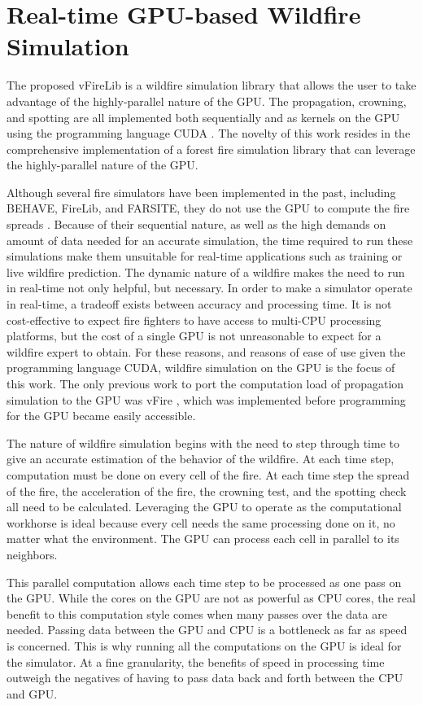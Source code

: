 \chapter{Real-time GPU-based Wildfire Simulation}
\label{chapter:gpuSim}
The proposed vFireLib is a wildfire simulation library that allows the user to take advantage of the highly-parallel nature of the GPU. The propagation, crowning, and spotting are all implemented both sequentially and as kernels on the GPU using the programming language CUDA \cite{cuda}. The novelty of this work resides in the comprehensive implementation of a forest fire simulation library that can leverage the highly-parallel nature of the GPU. 

Although several fire simulators have been implemented in the past, including BEHAVE, FireLib, and FARSITE, they do not use the GPU to compute the fire spreads \cite{fireLib,BEHAVE,FARSITE}. Because of their sequential nature, as well as the high demands on amount of data needed for an accurate simulation, the time required to run these simulations make them unsuitable for real-time applications such as training or live wildfire prediction. The dynamic nature of a wildfire makes the need to run in real-time not only helpful, but necessary. In order to make a simulator operate in real-time, a tradeoff exists between accuracy and processing time. It is not cost-effective to expect fire fighters to have access to multi-CPU processing platforms, but the cost of a single GPU is not unreasonable to expect for a wildfire expert to obtain. For these reasons, and reasons of ease of use given the programming language CUDA, wildfire simulation on the GPU is the focus of this work. The only previous work to port the computation load of propagation simulation to the GPU was vFire \cite{vFire}, which was implemented before programming for the GPU became easily accessible. 

The nature of wildfire simulation begins with the need to step through time to give an accurate estimation of the behavior of the wildfire. At each time step, computation must be done on every cell of the fire. At each time step the spread of the fire, the acceleration of the fire, the crowning test, and the spotting check all need to be calculated. Leveraging the GPU to operate as the computational workhorse is ideal because every cell needs the same processing done on it, no matter what the environment. The GPU can process each cell in parallel to its neighbors. 

This parallel computation allows each time step to be processed as one pass on the GPU. While the cores on the GPU are not as powerful as CPU cores, the real benefit to this computation style comes when many passes over the data are needed. Passing data between the GPU and CPU is a bottleneck as far as speed is concerned. This is why running all the computations on the GPU is ideal for the simulator. At a fine granularity, the benefits of speed in processing time outweigh the negatives of having to pass data back and forth between the CPU and GPU.

